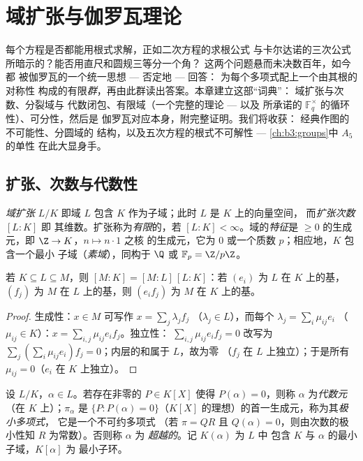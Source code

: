 \chapter{域扩张与伽罗瓦理论}\label{ch:b3:galois}

每个方程是否都能用根式求解，正如二次方程的求根公式
与卡尔达诺的三次公式所暗示的？能否用直尺和圆规三等分一个角？
这两个问题悬而未决数百年，如今都
被伽罗瓦的一个统一思想 --- 否定地 --- 回答：
为每个多项式配上一个由其根的对称性
构成的有限\emph{群}，再由此群读出答案。本章建立这部“词典”：
域扩张与次数、分裂域与
代数闭包、有限域（一个完整的理论 --- 以及
所承诺的 $\mathbb F_q^\times$ 的循环性）、可分性，然后是
伽罗瓦对应本身，附完整证明。我们将收获：
经典作图的不可能性、分圆域的
结构，以及五次方程的根式不可解性 ---
\cref{ch:b3:groups}中 $A_5$ 的单性
在此大显身手。

\section{扩张、次数与代数性}

\begin{definition}\label{def:b3:galois:extension}
\emph{域扩张} $L/K$ 即域
$L$ 包含 $K$ 作为子域；此时 $L$ 是 $K$ 上的向量空间，
而\emph{扩张次数} $[L:K]$ 即
其维数。扩张称为\emph{有限}的，若 $[L:K] <
\infty$。域的\emph{特征}是
$\geq 0$ 的生成元，即 $\Z \to K$，$n \mapsto n\cdot 1$ 之核
的生成元，它为 $0$ 或一个质数 $p$；相应地，$K$ 包含一个最小
子域（\emph{素域}），同构于 $\Q$ 或 $\mathbb
F_p = \Z/p\Z$。
\end{definition}

\begin{theorem}[塔律]\label{thm:b3:galois:tower}
若 $K \subseteq L \subseteq M$，则 $[M:K] = [M:L]\,[L:K]$：若
$(e_i)$ 为 $L$ 在 $K$ 上的基，$(f_j)$ 为 $M$ 在
$L$ 上的基，则 $(e_if_j)$ 为 $M$ 在
$K$ 上的基。
\end{theorem}

\begin{proof}
生成性：$x \in M$ 可写作 $x = \sum_j \lambda_jf_j$
（$\lambda_j \in L$），而每个 $\lambda_j = \sum_i \mu_{ij}e_i$
（$\mu_{ij} \in K$）：$x = \sum_{i,j}\mu_{ij}e_if_j$。独立性：
$\sum_{i,j}\mu_{ij}e_if_j = 0$ 改写为 $\sum_j (\sum_i
\mu_{ij}e_i)f_j = 0$；内层的和属于 $L$，故为零
（$f_j$ 在 $L$ 上独立）；于是所有 $\mu_{ij} = 0$（$e_i$
在 $K$ 上独立）。
\end{proof}

\begin{definition}\label{def:b3:galois:algebraic}
设 $L/K$，$\alpha \in L$。若存在非零的 $P \in K[X]$ 使得
$P(\alpha) = 0$，则称 $\alpha$ 为\emph{代数元}
（在 $K$ 上）；$\pi_\alpha$ 是
$\{P : P(\alpha) = 0\}$（$K[X]$ 的理想）的首一生成元，称为其\emph{极小多项式}，
它是一个不可约多项式
（若 $\pi = QR$ 且 $Q(\alpha) = 0$，则由次数的极小性知 $R$
为常数）。否则称 $\alpha$ 为
\emph{超越的}。记 $K(\alpha)$ 为 $L$ 中
包含 $K$ 与 $\alpha$ 的最小子域，$K[\alpha]$ 为
最小子环。
\end{definition}

